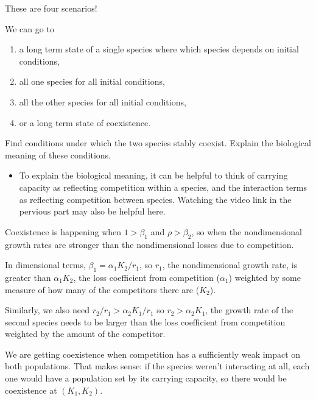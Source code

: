 \documentclass[12pt,letterpaper,answers]{exam}
\begin{document}
\begin{questions}
\begin{parts}
\begin{solution}
These are four scenarios!

We can go to 
\begin{enumerate}
\item a long term state of a single species where which species depends on initial conditions,
\item all one species for all initial conditions, 
\item all the other species for all initial conditions,  
\item or a long term state of coexistence.
\end{enumerate}



\end{solution}

\item Find conditions under which the two species stably coexist.  Explain the biological meaning of these conditions.  

\begin{itemize}
    \item To explain the biological meaning, it can be helpful to think of carrying capacity as reflecting competition within a species, and the interaction terms as reflecting competition between species.  Watching the video link in the pervious part may also be helpful here.
\end{itemize}

\begin{solution}

Coexistence is happening when $1 > \beta_1$ and $\rho > \beta_2$, so when the nondimensional growth rates are stronger than the nondimensional losses due to competition.  

In dimensional terms, $\beta_1 = \alpha_1 K_2/r_1$, so $r_1$, the nondimensional growth rate, is greater than $\alpha_1K_2$, the loss coefficient from competition ($\alpha_1$) weighted by some measure of how many of the competitors there are ($K_2$).

Similarly, we also need $r_2/r_1 > \alpha_2K_1/r_1$ so $r_2 > \alpha_2 K_1$, the growth rate of the second species needs to be larger than the loss coefficient from competition weighted by the amount of the competitor.

We are getting coexistence when competition has a sufficiently weak impact on both populations.  That makes sense: if the species weren't interacting at all, each one would have a population set by its carrying capacity, so there would be coexistence at $(K_1, K_2)$.


\end{solution}
\end{parts}
\end{questions}
\end{document}
